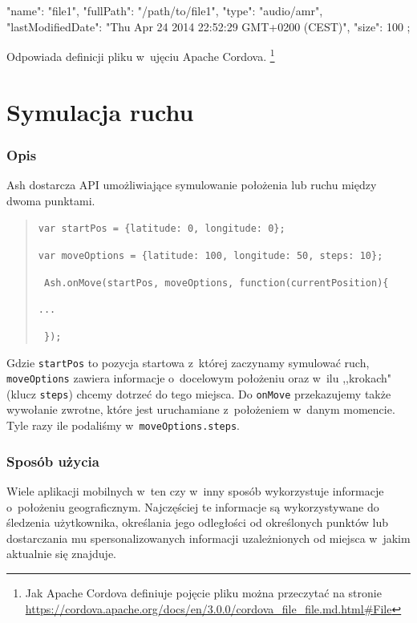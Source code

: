 \documentclass[brudnopis]{xmgr}
\begin{document}
\begin{javascriptcode}
   {
       "name": "file1",
       "fullPath": "/path/to/file1",
       "type": "audio/amr",
       "lastModifiedDate": 
            "Thu Apr 24 2014 22:52:29 GMT+0200 (CEST)",
       "size": 100
   };
\end{javascriptcode}

Odpowiada definicji pliku w~ujęciu Apache Cordova. 
\footnote{Jak Apache Cordova definiuje pojęcie pliku można przeczytać na stronie \url{https://cordova.apache.org/docs/en/3.0.0/cordova_file_file.md.html\#File} }

\section{Symulacja ruchu}

\subsubsection{Opis}
Ash dostarcza API umożliwiające symulowanie położenia lub ruchu między dwoma punktami.

\begin{quote}
  \texttt{var startPos = \{latitude: 0, longitude: 0\};}

  \texttt{var moveOptions = \{latitude: 100, longitude: 50, steps: 10\};}

  \texttt{ Ash.onMove(startPos, moveOptions, function(currentPosition)\{  }

    \texttt{...} 

  \texttt{   \});  }
\end{quote}

Gdzie \texttt{startPos} to pozycja startowa z~której zaczynamy symulować ruch, \texttt{moveOptions} zawiera informacje o~docelowym położeniu oraz w~ilu ,,krokach" (klucz \texttt{steps}) chcemy dotrzeć do tego miejsca. Do \texttt{onMove} przekazujemy także wywołanie zwrotne, które jest uruchamiane z~położeniem w~danym momencie. Tyle razy ile podaliśmy w~\texttt{moveOptions.steps}. 

\subsubsection{Sposób użycia}

Wiele aplikacji mobilnych w~ten czy w~inny sposób wykorzystuje informacje o~położeniu geograficznym. Najczęściej te informacje są wykorzystywane do śledzenia użytkownika, określania jego odległości od określonych punktów lub dostarczania mu spersonalizowanych informacji uzależnionych od miejsca w~jakim aktualnie się znajduje. 
\end{document}

